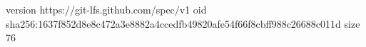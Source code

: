 version https://git-lfs.github.com/spec/v1
oid sha256:1637f852d8e8c472a3e8882a4ccedfb49820afe54f66f8cbff988c26688c011d
size 76
